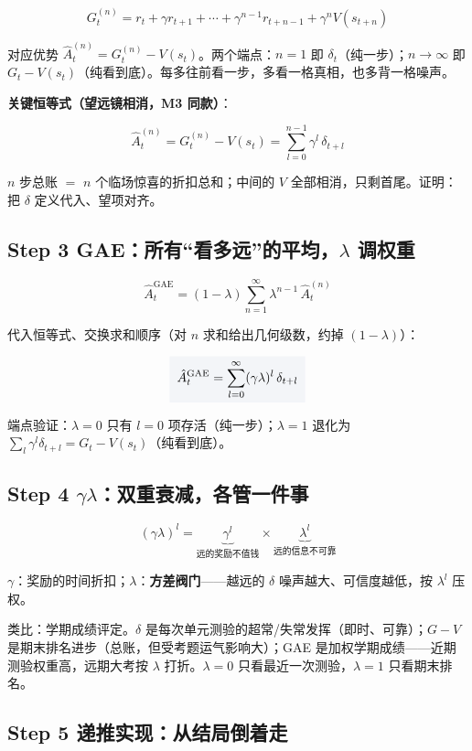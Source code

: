 \documentclass[UTF8,12pt,a4paper]{ctexrep}
\renewcommand{\boxed}[1]{{\colorbox{lightgray}{$\displaystyle #1$}}}
\newcommand{\plain}[1]{\begin{plainbox}#1\end{plainbox}}
\begin{document}
$$
G_t^{(n)} = r_t + \gamma r_{t+1} + \cdots + \gamma^{n-1} r_{t+n-1} + \gamma^{n} V(s_{t+n})
$$

对应优势 $\hat{A}^{(n)}_t = G_t^{(n)} - V(s_t)$。两个端点：$n=1$ 即 $\delta_t$（纯一步）；$n\to\infty$ 即 $G_t - V(s_t)$（纯看到底）。每多往前看一步，多看一格真相，也多背一格噪声。

\textbf{关键恒等式（望远镜相消，M3 同款）}：

$$
\hat{A}^{(n)}_t = G_t^{(n)} - V(s_t) = \sum_{l=0}^{n-1} \gamma^{l}\, \delta_{t+l}
$$

\plain{$n$ 步总账 $=$ $n$ 个临场惊喜的折扣总和；中间的 $V$ 全部相消，只剩首尾。证明：把 $\delta$ 定义代入、望项对齐。}

\subsection*{Step 3 \; GAE：所有``看多远''的平均，$\lambda$ 调权重}

$$
\hat{A}^{\mathrm{GAE}}_t = (1-\lambda)\sum_{n=1}^{\infty} \lambda^{n-1}\, \hat{A}^{(n)}_t
$$

代入恒等式、交换求和顺序（对 $n$ 求和给出几何级数，约掉 $(1-\lambda)$）：

$$
\boxed{\;\hat{A}^{\mathrm{GAE}}_t = \sum_{l=0}^{\infty} (\gamma\lambda)^{l}\, \delta_{t+l}\;}
$$

端点验证：$\lambda = 0$ 只有 $l=0$ 项存活（纯一步）；$\lambda = 1$ 退化为 $\sum_l \gamma^l \delta_{t+l} = G_t - V(s_t)$（纯看到底）。

\subsection*{Step 4 \; $\gamma\lambda$：双重衰减，各管一件事}

$$
(\gamma\lambda)^{l} = \underbrace{\gamma^l}_{\text{远的奖励不值钱}} \times \underbrace{\lambda^l}_{\text{远的信息不可靠}}
$$

$\gamma$：奖励的时间折扣；$\lambda$：\textbf{方差阀门}——越远的 $\delta$ 噪声越大、可信度越低，按 $\lambda^l$ 压权。

\plain{类比：学期成绩评定。$\delta$ 是每次单元测验的超常/失常发挥（即时、可靠）；$G - V$ 是期末排名进步（总账，但受考题运气影响大）；GAE 是加权学期成绩——近期测验权重高，远期大考按 $\lambda$ 打折。$\lambda=0$ 只看最近一次测验，$\lambda=1$ 只看期末排名。}

\subsection*{Step 5 \; 递推实现：从结局倒着走}
\end{document}
